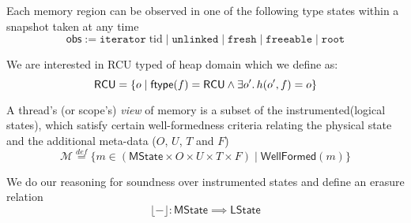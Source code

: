 Each memory region can be observed in one of the following type states within a snapshot taken at any time
\[\textsf{obs} := \texttt{iterator} \; \mathrm{tid} \mid \texttt{unlinked} \mid \texttt{fresh} \mid \texttt{freeable} \mid \texttt{root}\]

We are interested in \textsf{RCU} typed of heap domain which we define as:
\[\textsf{RCU} = \{ o \mid \textsf{ftype}(f) = \textsf{RCU} \land \exists o' \ldotp h(o',f) = o \}\]

A thread's (or scope's) \emph{view} of memory is a subset of the instrumented(logical states), which satisfy certain well-formedness criteria relating the physical state and the additional meta-data ($O$, $U$, $T$ and $F$)
\[\mathcal{M} \stackrel{def}{=} \{ m \in (\textsf{MState} \times O \times U \times T \times F) \mid  \textsf{WellFormed}(m) \} \]

We do our reasoning for soundness over instrumented states and define an erasure relation
\[\lfloor - \rfloor :\mathsf{MState} \implies \textsf{LState}\]

